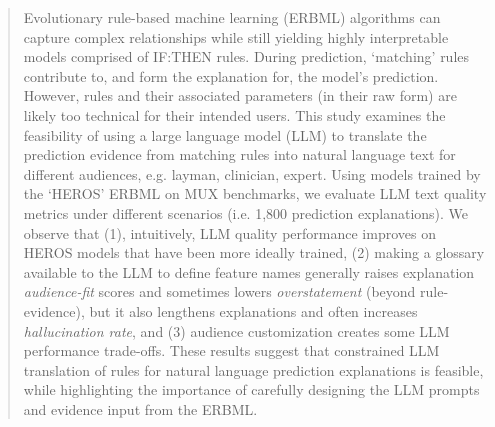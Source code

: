 \documentclass[sigconf]{acmart}
\begin{document}
\begin{abstract}
Evolutionary rule-based machine learning (ERBML) algorithms can capture complex relationships while still yielding highly interpretable models comprised of IF:THEN rules. During prediction, `matching' rules contribute to, and form the explanation for, the model's prediction. However, rules and their associated parameters (in their raw form) are likely too technical for their intended users. This study examines the feasibility of using a large language model (LLM) to translate the prediction evidence from matching rules into natural language text for different audiences, e.g. layman, clinician, expert. Using models trained by the `HEROS' ERBML on MUX benchmarks, we evaluate LLM text quality metrics under different scenarios (i.e. 1{,}800 prediction explanations). We observe that (1), intuitively, LLM quality performance improves on HEROS models that have been more ideally trained, (2) making a glossary available to the LLM to define feature names generally raises explanation \textit{audience-fit} scores and sometimes lowers \textit{overstatement} (beyond rule-evidence), but it also lengthens explanations and often increases \emph{hallucination rate}, and (3) audience customization creates some LLM performance trade-offs. These results suggest that constrained LLM translation of rules for natural language prediction explanations is feasible, while highlighting the importance of carefully designing the LLM prompts and evidence input from the ERBML.


\end{abstract}



\end{document}
